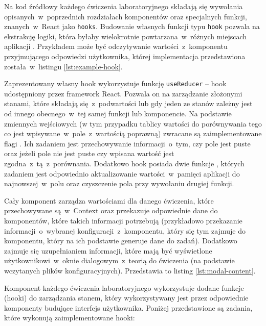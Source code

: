 Na kod źródłowy każdego ćwiczenia laboratoryjnego składają się wywołania opisanych~w~poprzednich
rozdziałach komponentów oraz specjalnych funkcji, znanych~w~React jako \texttt{hooks}. Budowanie
własnych funkcji typu \texttt{hook} pozwala na ekstrakcję logiki, która byłaby wielokrotnie
powtarzana~w~różnych miejscach aplikacji \cite{react-docs}. Przykładem może być odczytywanie
wartości~z~komponentu przyjmującego odpowiedzi użytkownika, której implementacja przedstawiona
została~w~listingu
\ref{lst:example-hook}.


Zaprezentowany własny hook wykorzystuje funkcję \texttt{useReducer} -- hook udostępniony przez
framework React. Pozwala on na zarządzanie złożonymi stanami, które składają się~z~podwartości lub
gdy jeden ze stanów zależny jest od innego obecnego~w~tej samej funkcji lub komponencie. Na
podstawie zmiennych wejściowych (w tym przypadku tablicy wartości do porównywania tego co jest
wpisywane~w~pole~z~wartością poprawną) zwracane są zaimplementowane flagi . Ich zadaniem jest przechowywanie informacji~o~tym, czy pole jest puste oraz jeżeli
pole nie jest puste czy wpisana wartość jest zgodna~z~tą~z~porównania. Dodatkowo hook posiada dwie
funkcje , których zadaniem jest odpowiednio aktualizowanie
wartości~w~pamięci aplikacji do najnowszej~w~polu oraz czyszczenie pola przy wywołaniu drugiej
funkcji.

Cały komponent zarządza wartościami dla danego ćwiczenia, które przechowywane są~w~Context oraz
przekazuje odpowiednie dane do komponentów, które takich informacji potrzebują
(przykładowo przekazanie informacji~o~wybranej konfiguracji~z~komponentu, który się tym zajmuje do
komponentu, który na ich podstawie generuje dane do zadań). Dodatkowo zajmuje się uzupełnianiem
informacji, które mają być wyświetlone użytkownikowi~w~oknie dialogowym~z~teorią do ćwiczenia
(na podstawie wczytanych plików konfiguracyjnych). Przedstawia to listing \ref{lst:modal-content}.


Komponent każdego ćwiczenia laboratoryjnego wykorzystuje dodane funkcje (hooki) do zarządzania
stanem, który wykorzystywany jest przez odpowiednie komponenty budujące interfejs użytkownika.
Poniżej przedstawione są zadania, które wykonują zaimplementowane hooki:

